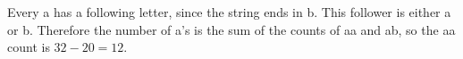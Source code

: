 Every a has a following letter, since the string ends in b. This follower is either a or b. Therefore the number of a's is the sum of the counts of aa and ab, so the aa count is $32-20=\boxed{12}$.
